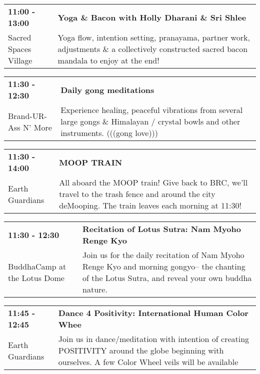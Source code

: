 \begin{tabular}{ p{1in} p{2.2in} }
    \textbf{11:00 - 13:00} & \textbf{Yoga \& Bacon with Holly Dharani \& Sri Shlee} \\
    Sacred Spaces Village \newline  & Yoga flow, intention setting, pranayama, partner work, adjustments \& a collectively constructed sacred bacon mandala to enjoy at the end! \\
    \hline 
\end{tabular}
    
\begin{tabular}{ p{1in} p{2.2in} }
    \textbf{11:30 - 12:30} & \textbf{Daily gong meditations} \\
    Brand-UR-Ass N' More \newline  & Experience healing, peaceful vibrations from several large gongs \& Himalayan / crystal bowls and other instruments. (((gong love))) \\
    \hline 
\end{tabular}
    
\begin{tabular}{ p{1in} p{2.2in} }
    \textbf{11:30 - 14:00} & \textbf{MOOP TRAIN } \\
    Earth Guardians \newline  & All aboard the MOOP train! Give back to BRC, we'll travel to the trash fence and around the city deMooping. The train leaves each morning at 11:30! \\
    \hline 
\end{tabular}
    
\begin{tabular}{ p{1in} p{2.2in} }
    \textbf{11:30 - 12:30} & \textbf{Recitation of Lotus Sutra: Nam Myoho Renge Kyo} \\
    BuddhaCamp at the Lotus Dome \newline  & Join us for the daily recitation of Nam Myoho Renge Kyo and morning gongyo-- the chanting of the Lotus Sutra, and reveal your own buddha nature. \\
    \hline 
\end{tabular}
    
\begin{tabular}{ p{1in} p{2.2in} }
    \textbf{11:45 - 12:45} & \textbf{Dance 4 Positivity: International Human Color Whee} \\
    Earth Guardians \newline  & Join us in dance/meditation with intention of creating POSITIVITY around the globe beginning with ourselves. A few Color Wheel veils will be available \\
    \hline 
\end{tabular}
    
